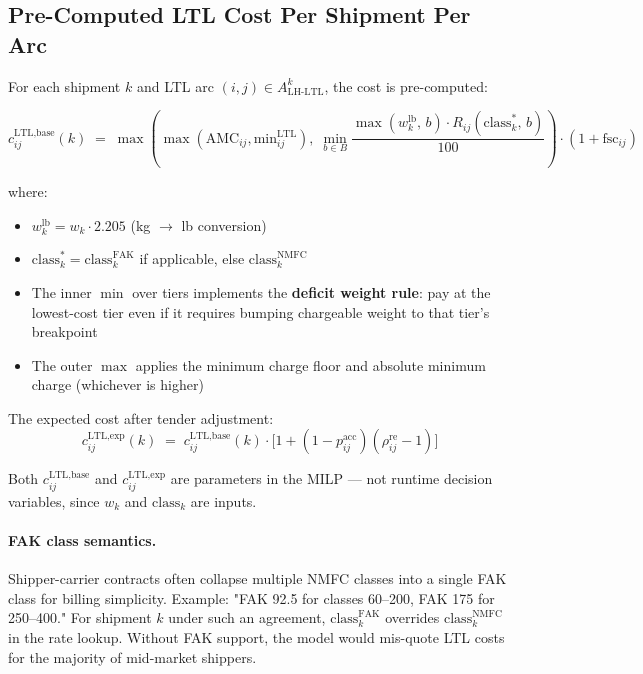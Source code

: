 \documentclass[11pt,a4paper]{article}
\theoremstyle{definition}
\begin{document}
\subsection{Pre-Computed LTL Cost Per Shipment Per Arc}
\label{sec:ltl-precomp}

For each shipment $k$ and LTL arc $(i,j) \in A^k_{\text{LH-LTL}}$, the cost is pre-computed:

\begin{equation}
  c_{ij}^{\text{LTL,base}}(k) \;=\; \max\!\left(
    \max(\text{AMC}_{ij}, \text{min}_{ij}^{\text{LTL}}),\;
    \min_{b \in B} \frac{\max(w_k^{\text{lb}},\, b) \cdot R_{ij}(\text{class}_k^{*},\, b)}{100}
  \right) \cdot (1 + \text{fsc}_{ij})
  \label{eq:ltl-base-cost}
\end{equation}

where:
\begin{itemize}[noitemsep]
  \item $w_k^{\text{lb}} = w_k \cdot 2.205$ (kg $\to$ lb conversion)
  \item $\text{class}_k^{*} = \text{class}_k^{\text{FAK}}$ if applicable, else $\text{class}_k^{\text{NMFC}}$
  \item The inner $\min$ over tiers implements the \textbf{deficit weight rule}: pay at the lowest-cost tier even if it requires bumping chargeable weight to that tier's breakpoint
  \item The outer $\max$ applies the minimum charge floor and absolute minimum charge (whichever is higher)
\end{itemize}

The expected cost after tender adjustment:
\begin{equation}
  c_{ij}^{\text{LTL,exp}}(k) \;=\; c_{ij}^{\text{LTL,base}}(k) \cdot \bigl[1 + (1 - p_{ij}^{\text{acc}})(\rho_{ij}^{\text{re}} - 1)\bigr]
\end{equation}

Both $c_{ij}^{\text{LTL,base}}$ and $c_{ij}^{\text{LTL,exp}}$ are parameters in the MILP --- not
runtime decision variables, since $w_k$ and $\text{class}_k$ are inputs.

\paragraph{FAK class semantics.}
Shipper-carrier contracts often collapse multiple NMFC classes into a single FAK class for
billing simplicity. Example: "FAK 92.5 for classes 60--200, FAK 175 for 250--400."
For shipment $k$ under such an agreement, $\text{class}_k^{\text{FAK}}$ overrides
$\text{class}_k^{\text{NMFC}}$ in the rate lookup. Without FAK support, the model would
mis-quote LTL costs for the majority of mid-market shippers.
\end{document}

